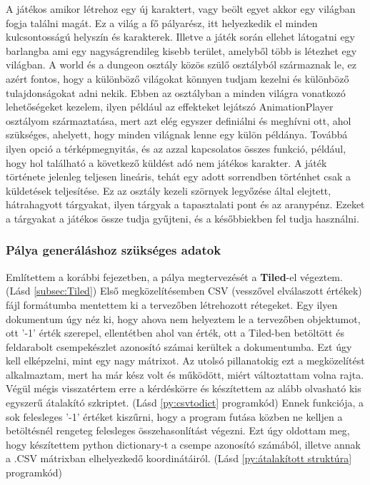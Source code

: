 \indent \indent A játékos amikor létrehoz egy új karaktert, vagy beölt egyet akkor egy világban fogja találni magát. Ez a világ a fő pályarész, itt helyezkedik el minden kulcsontosságú helyszín és karakterek. Illetve a játék során ellehet látogatni egy barlangba ami egy nagyságrendileg kisebb terület, amelyből több is létezhet egy világban.
 A world és a dungeon osztály közös szülő osztályból származnak le, ez azért fontos, hogy a különböző világokat könnyen tudjam kezelni
 és különböző tulajdonságokat adni nekik. Ebben az osztályban a minden világra vonatkozó lehetőségeket kezelem, ilyen például
  az effekteket lejátszó AnimationPlayer osztályom származtatása, mert azt elég egyszer definiálni és meghívni ott, ahol szükséges, ahelyett,
   hogy minden világnak lenne egy külön példánya. Továbbá ilyen opció a térképmegnyitás, és az azzal kapcsolatos összes funkció,
    például, hogy hol található a következő küldést adó nem játékos karakter. A játék története jelenleg teljesen lineáris,
     tehát egy adott sorrendben történhet csak a küldetések teljesítése. Ez az osztály kezeli szörnyek legyőzése által elejtett, hátrahagyott tárgyakat, ilyen tárgyak a tapasztalati pont és az aranypénz.
       Ezeket a tárgyakat a játékos össze tudja gyűjteni, és a későbbiekben fel tudja használni.  

\subsubsection{Pálya generáláshoz szükséges adatok} \label {subsec:Pálya generáláshoz szükséges adatok}

\indent \indent Említettem a korábbi fejezetben, a pálya megtervezését a \textbf{Tiled}-el végeztem. (Lásd \ref{subsec:Tiled}) 
Első megközelítésemben CSV (vesszővel elválaszott értékek) fájl formátumba mentettem ki a tervezőben létrehozott rétegeket. Egy ilyen dokumentum úgy néz ki, hogy ahova nem helyeztem le a tervezőben objektumot, ott '-1' érték szerepel, ellentétben ahol van érték, ott a Tiled-ben betöltött és feldarabolt csempekészlet azonosító számai kerültek a dokumentumba. Ezt úgy kell elképzelni, mint egy nagy mátrixot. Az utolsó pillanatokig ezt a megközelítést alkalmaztam, mert ha már kész volt és működött, miért változtattam volna rajta. Végül mégis visszatértem erre a kérdéskörre és készítettem az alább olvasható kis egyszerű átalakító szkriptet. (Lásd \ref{py:csvtodict} programkód) Ennek funkciója, a sok felesleges '-1' értéket kiszűrni, hogy a program futása közben ne kelljen a betöltésnél rengeteg felesleges összehasonlítást végezni. Ezt úgy oldottam meg, hogy készítettem python dictionary-t a csempe azonosító számából, illetve annak a .CSV mátrixban elhelyezkedő koordinátáiról. (Lásd \ref{py:átalakított struktúra} programkód)


